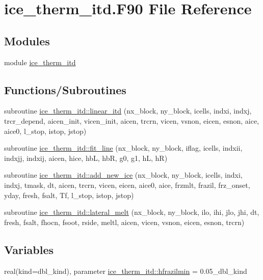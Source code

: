 \hypertarget{ice__therm__itd_8F90}{
\section{ice\_\-therm\_\-itd.F90 File Reference}
\label{ice__therm__itd_8F90}
}
\subsection*{Modules}
\begin{DoxyCompactItemize}
\item 
module \hyperlink{namespaceice__therm__itd}{ice\_\-therm\_\-itd}
\end{DoxyCompactItemize}
\subsection*{Functions/Subroutines}
\begin{DoxyCompactItemize}
\item 
subroutine \hyperlink{namespaceice__therm__itd_acd44275babbe78e10bc9ddcbd1c631cd}{ice\_\-therm\_\-itd::linear\_\-itd} (nx\_\-block, ny\_\-block, icells, indxi, indxj, trcr\_\-depend, aicen\_\-init, vicen\_\-init, aicen, trcrn, vicen, vsnon, eicen, esnon, aice, aice0, l\_\-stop, istop, jstop)
\item 
subroutine \hyperlink{namespaceice__therm__itd_a6eda9b04392b3bc42d5b8cb373e8fc7d}{ice\_\-therm\_\-itd::fit\_\-line} (nx\_\-block, ny\_\-block, iflag, icells, indxii, indxjj, indxij, aicen, hice, hbL, hbR, g0, g1, hL, hR)
\item 
subroutine \hyperlink{namespaceice__therm__itd_a6c41e380c1a3c0ee4f833a4f31f80de2}{ice\_\-therm\_\-itd::add\_\-new\_\-ice} (nx\_\-block, ny\_\-block, icells, indxi, indxj, tmask, dt, aicen, trcrn, vicen, eicen, aice0, aice, frzmlt, frazil, frz\_\-onset, yday, fresh, fsalt, Tf, l\_\-stop, istop, jstop)
\item 
subroutine \hyperlink{namespaceice__therm__itd_a31484de362b540a7b089bea7e7cc8e81}{ice\_\-therm\_\-itd::lateral\_\-melt} (nx\_\-block, ny\_\-block, ilo, ihi, jlo, jhi, dt, fresh, fsalt, fhocn, fsoot, rside, meltl, aicen, vicen, vsnon, eicen, esnon, trcrn)
\end{DoxyCompactItemize}
\subsection*{Variables}
\begin{DoxyCompactItemize}
\item 
real(kind=dbl\_\-kind), parameter \hyperlink{namespaceice__therm__itd_addb09aa25c77eb5ffb880aab7ddff915}{ice\_\-therm\_\-itd::hfrazilmin} = 0.05\_\-dbl\_\-kind
\end{DoxyCompactItemize}
